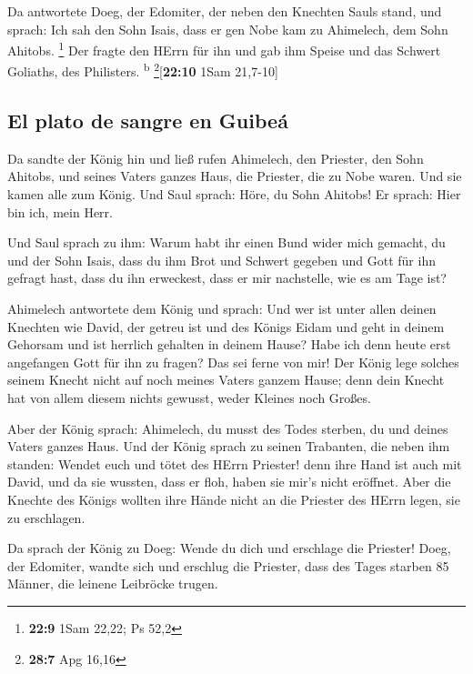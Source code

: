  Da antwortete Doeg, der Edomiter, der neben den Knechten
Sauls stand, und sprach: Ich sah den Sohn Isais, dass er gen Nobe kam zu
Ahimelech, dem Sohn Ahitobs. \footnote{\textbf{22:9} 1Sam 22,22; Ps 52,2}
 Der fragte den HErrn für ihn und gab ihm Speise und das
Schwert Goliaths, des Philisters. \textsuperscript{b}
\footnote{\textbf{28:7} Apg 16,16}{[}\textbf{22:10} 1Sam 21,7-10{]}

\hypertarget{el-plato-de-sangre-en-guibeuxe1}{%
\subsection{El plato de sangre en
Guibeá}\label{el-plato-de-sangre-en-guibeuxe1}}

 Da sandte der König hin und ließ rufen Ahimelech, den
Priester, den Sohn Ahitobs, und seines Vaters ganzes Haus, die Priester,
die zu Nobe waren. Und sie kamen alle zum König.  Und
Saul sprach: Höre, du Sohn Ahitobs! Er sprach: Hier bin ich, mein Herr.

 Und Saul sprach zu ihm: Warum habt ihr einen Bund wider
mich gemacht, du und der Sohn Isais, dass du ihm Brot und Schwert
gegeben und Gott für ihn gefragt hast, dass du ihn erweckest, dass er
mir nachstelle, wie es am Tage ist?

 Ahimelech antwortete dem König und sprach: Und wer ist
unter allen deinen Knechten wie David, der getreu ist und des Königs
Eidam und geht in deinem Gehorsam und ist herrlich gehalten in deinem
Hause?  Habe ich denn heute erst angefangen Gott für ihn
zu fragen? Das sei ferne von mir! Der König lege solches seinem Knecht
nicht auf noch meines Vaters ganzem Hause; denn dein Knecht hat von
allem diesem nichts gewusst, weder Kleines noch Großes.

 Aber der König sprach: Ahimelech, du musst des Todes
sterben, du und deines Vaters ganzes Haus.  Und der König
sprach zu seinen Trabanten, die neben ihm standen: Wendet euch und tötet
des HErrn Priester! denn ihre Hand ist auch mit David, und da sie
wussten, dass er floh, haben sie mir's nicht eröffnet. Aber die Knechte
des Königs wollten ihre Hände nicht an die Priester des HErrn legen, sie
zu erschlagen.

 Da sprach der König zu Doeg: Wende du dich und erschlage
die Priester! Doeg, der Edomiter, wandte sich und erschlug die Priester,
dass des Tages starben 85 Männer, die leinene Leibröcke trugen.

